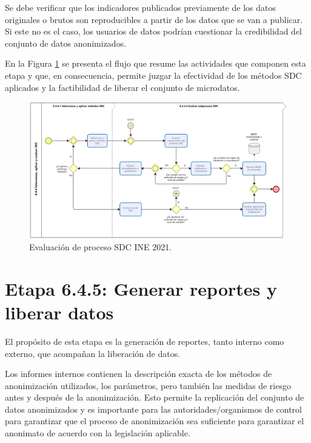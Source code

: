 \documentclass[]{book}
\theoremstyle{definition}
\theoremstyle{definition}
\theoremstyle{definition}
\theoremstyle{definition}
\theoremstyle{remark}
\begin{document}
Se debe verificar que los indicadores publicados previamente de los datos originales o brutos son reproducibles a partir de los datos que se van a publicar. Si este no es el caso, los usuarios de datos podrían cuestionar la credibilidad del conjunto de datos anonimizados.

En la Figura \ref{fig:evalSDC} se presenta el flujo que resume las actividades que componen esta etapa y que, en consecuencia, permite juzgar la efectividad de los métodos SDC aplicados y la factibilidad de liberar el conjunto de microdatos.

\begin{figure}

{\centering \includegraphics[width=0.9\linewidth]{Imagenes/Eval_Proc_SDC} 

}

\caption{Evaluación de proceso SDC INE 2021.}\label{fig:evalSDC}
\end{figure}

\hypertarget{etapa-6.4.5-generar-reportes-y-liberar-datos}{%
\section{Etapa 6.4.5: Generar reportes y liberar datos}\label{etapa-6.4.5-generar-reportes-y-liberar-datos}}

El propósito de esta etapa es la generación de reportes, tanto interno como externo, que acompañan la liberación de datos.

Los informes internos contienen la descripción exacta de los métodos de anonimización utilizados, los parámetros, pero también las medidas de riesgo antes y después de la anonimización. Esto permite la replicación del conjunto de datos anonimizados y es importante para las autoridades/organismos de control para garantizar que el proceso de anonimización sea suficiente para garantizar el anonimato de acuerdo con la legislación aplicable.
\end{document}
